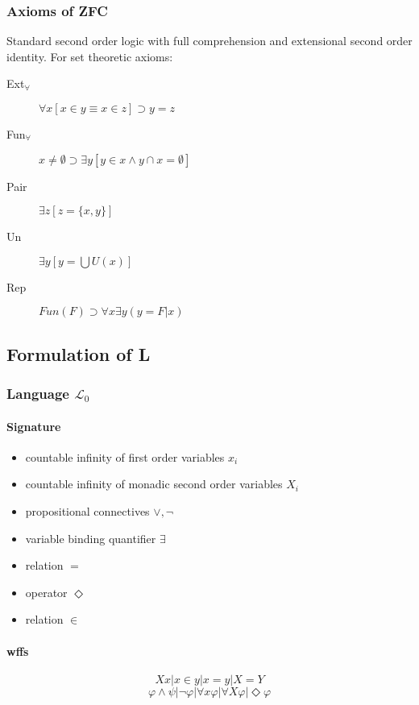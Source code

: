 \documentclass{article}
\begin{document}
\subsubsection{Axioms of ZFC}

Standard second order logic with full comprehension and extensional second order 
identity. For set theoretic axioms:

\begin{description}
    \item[Ext$_\forall$] $\forall x[x \in y \equiv x \in z] \supset y = z$
    \item[Fun$_\forall$] $ x \not = \emptyset \supset \exists y[y \in x \wedge y \cap x = \emptyset]$
    \item[Pair] $\exists z[z = \{x, y\}]$
    \item[Un] $\exists y [y = \bigcup{U}(x)]$
    \item[Rep] $Fun (F) \supset \forall x\exists y(y = F|x)$
\end{description}



\subsection{Formulation of L}

\subsubsection{Language $\mathcal{L}_0$}
\paragraph{Signature}
\begin{itemize}
    \item countable infinity of first order variables $x_i$
    \item countable infinity of monadic second order variables $X_i$
    \item propositional connectives $\vee, \neg$
    \item variable binding quantifier $\exists$
    \item relation $=$
    \item operator $\Diamond$
    \item relation $\in$
\end{itemize}

\paragraph{wffs}
    $$Xx | x \in y | x = y | X = Y$$
    $$\varphi \wedge \psi | \neg \varphi | \forall x \varphi | \forall X \varphi | \Diamond \varphi$$
\end{document}
